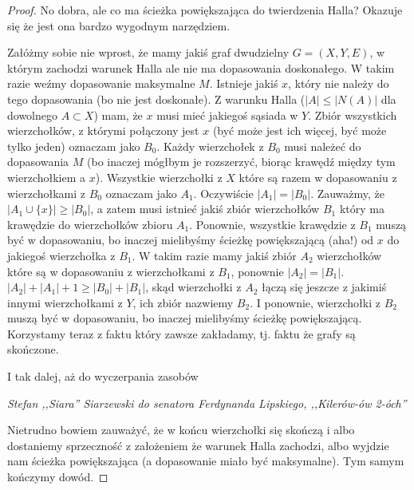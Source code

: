 \begin{proof}
      No dobra, ale co ma ścieżka powiększająca do twierdzenia Halla? Okazuje się że jest ona bardzo wygodnym narzędziem.

      Załóżmy sobie nie wprost, że mamy jakiś graf dwudzielny $G = (X,Y,E)$, w którym zachodzi warunek Halla ale nie ma dopasowania doskonałego. W takim razie weźmy dopasowanie maksymalne $M$. Istnieje jakiś $x$, który nie należy do tego dopasowania (bo nie jest doskonałe). Z warunku Halla ($|A| \leq |N(A)|$ dla dowolnego $A \subset X$) mam, że $x$ musi mieć jakiegoś sąsiada w $Y$. Zbiór wszystkich wierzchołków, z którymi połączony jest $x$ (być może jest ich więcej, być może tylko jeden) oznaczam jako $B_0$. Każdy wierzchołek z $B_0$ musi należeć do dopasowania $M$ (bo inaczej mógłbym je rozszerzyć, biorąc krawędź między tym wierzchołkiem a $x$). Wszystkie wierzchołki z $X$ które są razem w dopasowaniu z wierzchołkami z $B_0$ oznaczam jako $A_1$. Oczywiście $|A_1| = |B_0|$. Zauważmy, że $|A_1 \cup \{x\}| \geq |B_0|$, a zatem musi istnieć jakiś zbiór wierzchołków $B_1$ który ma krawędzie do wierzchołków zbioru $A_1$. Ponownie, wszystkie krawędzie z $B_1$ muszą być w dopasowaniu, bo inaczej mielibyśmy ścieżkę powiększającą (aha!) od $x$ do jakiegoś wierzchołka z $B_1$. W takim razie mamy jakiś zbiór $A_2$ wierzchołków które są w dopasowaniu z wierzchołkami z $B_1$, ponownie $|A_2| = |B_1|$. $|A_2| + |A_1| + 1 \geq |B_0| + |B_1|$, skąd wierzchołki z $A_2$ łączą się jeszcze z jakimiś innymi wierzchołkami z $Y$, ich zbiór nazwiemy $B_2$. I ponownie, wierzchołki z $B_2$ muszą być w dopasowaniu, bo inaczej mielibyśmy ścieżkę powiększającą. Korzystamy teraz z faktu który zawsze zakładamy, tj. faktu że grafy są skończone.
      
      \epigraph{I tak dalej, aż do wyczerpania zasobów}{\textit{Stefan ,,Siara'' Siarzewski do senatora Ferdynanda Lipskiego, ,,Kilerów-ów 2-óch''}}

      Nietrudno bowiem zauważyć, że w końcu wierzchołki się skończą i albo dostaniemy sprzeczność z założeniem że warunek Halla zachodzi, albo wyjdzie nam ścieżka powiększająca (a dopasowanie miało być maksymalne). Tym samym kończymy dowód. 
  \end{proof}